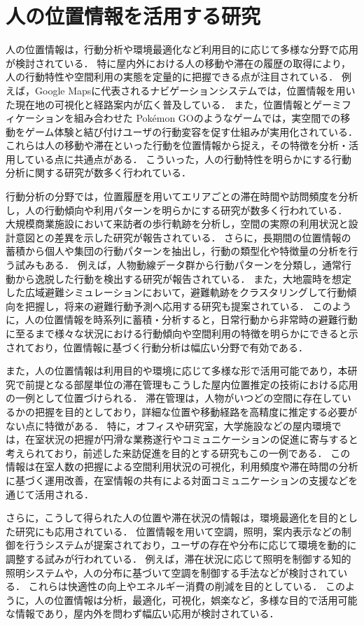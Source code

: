 \section{人の位置情報を活用する研究}
人の位置情報は，行動分析や環境最適化など利用目的に応じて多様な分野で応用が検討されている．
特に屋内外における人の移動や滞在の履歴の取得により，人の行動特性や空間利用の実態を定量的に把握できる点が注目されている．
例えば，Google Maps\cite{GoogleMap}に代表されるナビゲーションシステムでは，位置情報を用いた現在地の可視化と経路案内が広く普及している．
また，位置情報とゲーミフィケーションを組み合わせた Pokémon GO\cite{PokemonGo}のようなゲームでは，実空間での移動をゲーム体験と結び付けユーザの行動変容を促す仕組みが実用化されている．
これらは人の移動や滞在といった行動を位置情報から捉え，その特徴を分析・活用している点に共通点がある．
こういった，人の行動特性を明らかにする行動分析に関する研究が数多く行われている．


行動分析の分野では，位置履歴を用いてエリアごとの滞在時間や訪問頻度を分析し，人の行動傾向や利用パターンを明らかにする研究が数多く行われている．
大規模商業施設において来訪者の歩行軌跡を分析し，空間の実際の利用状況と設計意図との差異を示した研究\cite{layout}が報告されている．
さらに，長期間の位置情報の蓄積から個人や集団の行動パターンを抽出し，行動の類型化や特徴量の分析を行う試みもある．
例えば，人物動線データ群から行動パターンを分類し，通常行動から逸脱した行動を検出する研究\cite{pattern}が報告されている．
また，大地震時を想定した広域避難シミュレーションにおいて，避難軌跡をクラスタリングして行動傾向を把握し，将来の避難行動予測へ応用する研究\cite{simulation}も提案されている．
このように，人の位置情報を時系列に蓄積・分析すると，日常行動から非常時の避難行動に至るまで様々な状況における行動傾向や空間利用の特徴を明らかにできると示されており，位置情報に基づく行動分析は幅広い分野で有効である．


また，人の位置情報は利用目的や環境に応じて多様な形で活用可能であり，本研究で前提となる部屋単位の滞在管理もこうした屋内位置推定の技術における応用の一例として位置づけられる．
滞在管理は，人物がいつどの空間に存在しているかの把握を目的としており，詳細な位置や移動経路を高精度に推定する必要がない点に特徴がある．
特に，オフィスや研究室，大学施設などの屋内環境では，在室状況の把握が円滑な業務遂行やコミュニケーションの促進に寄与すると考えられており，前述した来訪促進を目的とする研究もこの一例である．
この情報は在室人数の把握による空間利用状況の可視化，利用頻度や滞在時間の分析に基づく運用改善，在室情報の共有による対面コミュニケーションの支援などを通じて活用される．


さらに，こうして得られた人の位置や滞在状況の情報は，環境最適化を目的とした研究にも応用されている．
位置情報を用いて空調，照明，案内表示などの制御を行うシステムが提案されており，ユーザの存在や分布に応じて環境を動的に調整する試みが行われている．
例えば，滞在状況に応じて照明を制御する知的照明システム\cite{light}や，人の分布に基づいて空調を制御する手法\cite{airControl}などが検討されている．
これらは快適性の向上やエネルギー消費の削減を目的としている．
このように，人の位置情報は分析，最適化，可視化，娯楽など，多様な目的で活用可能な情報であり，屋内外を問わず幅広い応用が検討されている．